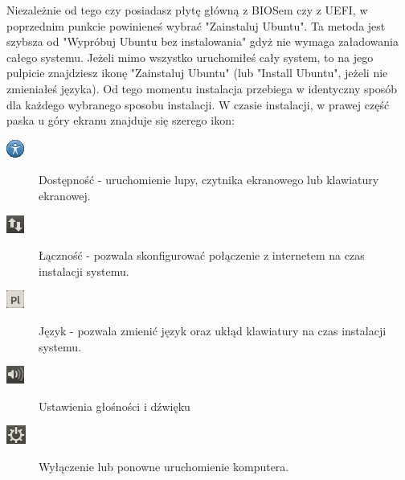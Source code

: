 Niezależnie od tego czy posiadasz płytę główną z BIOSem czy z UEFI, w poprzednim punkcie powinieneś wybrać "Zainstaluj Ubuntu". Ta metoda jest szybsza od "Wypróbuj Ubuntu bez instalowania" gdyż nie wymaga załadowania całego systemu. Jeżeli mimo wszystko uruchomiłeś cały system, to na jego pulpicie znajdziesz ikonę "Zainstaluj Ubuntu" (lub "Install Ubuntu", jeżeli nie zmieniałeś języka). Od tego momentu instalacja przebiega w identyczny sposób dla każdego wybranego sposobu instalacji.
W czasie instalacji, w prawej część paska u góry ekranu znajduje się szerego ikon:
\begin{description}
\item[\includegraphics{images/ikony_dostempnosc.png}]Dostępność - uruchomienie lupy, czytnika ekranowego lub klawiatury ekranowej.
\item[\includegraphics{images/ikony_internet.png}]Łączność - pozwala skonfigurować połączenie z internetem na czas instalacji systemu.
\item[\includegraphics{images/ikony_jezyk.png}]Język - pozwala zmienić język oraz ukłąd klawiatury na czas instalacji systemu.
\item[\includegraphics{images/ikony_dzwiek.png}]Ustawienia głośności i dźwięku
\item[\includegraphics{images/ikony_zasilanie.png}]Wyłączenie lub ponowne uruchomienie komputera.
\end{description}
\clearpage
